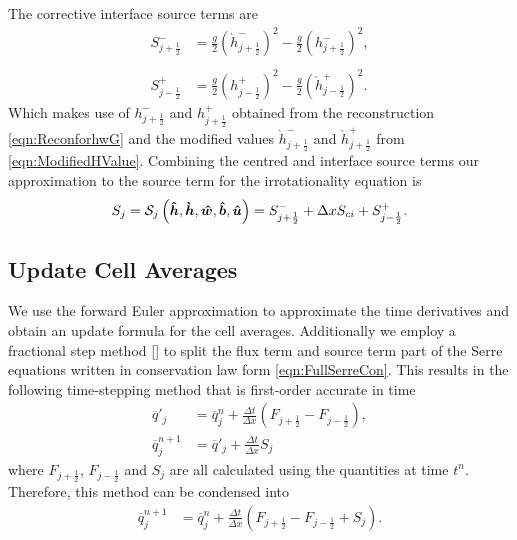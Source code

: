 The corrective interface source terms are
	\begin{align*}
	 S^{-}_{j + \frac{1}{2}} &=  \frac{g}{2} \left(\grave{h}^{-}_{j + \frac{1}{2}} \right)^2 - \frac{g}{2} \left(h^{-}_{j + \frac{1}{2}} \right)^2, \\ \\
	  S^{+}_{j - \frac{1}{2}} &=  \frac{g}{2} \left(h^{+}_{j - \frac{1}{2}}\right)^2 - \frac{g}{2}\left(\grave{h}^{+}_{j - \frac{1}{2}}\right)^2 .	 
	\end{align*}
Which makes use of $h^{-}_{j + \frac{1}{2}}$ and $h^{+}_{j + \frac{1}{2}}$ obtained from the reconstruction \eqref{eqn:ReconforhwG} and the modified values $\grave{h}^{-}_{j + \frac{1}{2}}$ and $\grave{h}^{+}_{j + \frac{1}{2}}$ from \eqref{eqn:ModifiedHValue}. Combining the centred and interface source terms our approximation to the source term for the irrotationality equation is
\begin{equation}
S_j = \mathcal{S}_j\left( \boldsymbol{\hat{h}},\boldsymbol{\grave{h}},\boldsymbol{\hat{w}},\boldsymbol{\hat{b}}, \boldsymbol{\hat{u}}  \right) =  S^{-}_{j + \frac{1}{2}} + \Delta x S_{ci} + S^{+}_{j - \frac{1}{2}}.
\label{eqn:SourceTerm}
\end{equation}


\subsection{Update Cell Averages}
We use the forward Euler approximation to approximate the time derivatives and obtain an update formula for the cell averages. Additionally we employ a fractional step method [] to split the flux term and source term part of the Serre equations written in conservation law form \eqref{eqn:FullSerreCon}. This results in the following time-stepping method that is first-order accurate in time
\begin{align*}
\overline{q}'_j &= \overline{q}^{n}_j + \frac{\Delta t}{\Delta x} \left(F_{j+\frac{1}{2}} - F_{j-\frac{1}{2}}\right), \\
\overline{q}^{n+1}_j &= \overline{q}'_j + \frac{\Delta t}{\Delta x} S_j
\end{align*}
where $F_{j+\frac{1}{2}}$, $F_{j-\frac{1}{2}}$ and $S_j$ are all calculated using the quantities at time $t^n$. Therefore, this method can be condensed into
\begin{align}
\overline{q}^{n+1}_j &= \overline{q}^{n}_j + \frac{\Delta t}{\Delta x} \left(F_{j+\frac{1}{2}} - F_{j-\frac{1}{2}} + S_j\right).
\label{eqn:UpdateMethod}
\end{align}

